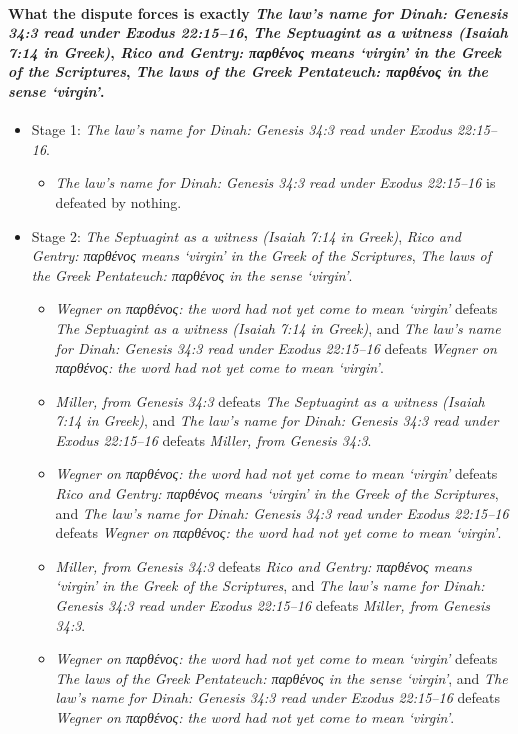 \documentclass[11pt]{article}
\begin{document}
\paragraph{What the dispute forces is exactly \emph{The law’s name for Dinah: Genesis 34:3 read under Exodus 22:15–16}, \emph{The Septuagint as a witness (Isaiah 7:14 in Greek)}, \emph{Rico and Gentry: παρθένος means ‘virgin’ in the Greek of the Scriptures}, \emph{The laws of the Greek Pentateuch: παρθένος in the sense ‘virgin’}.}
\begin{itemize}
\item Stage 1: \emph{The law’s name for Dinah: Genesis 34:3 read under Exodus 22:15–16}.
\begin{itemize}
\item \emph{The law’s name for Dinah: Genesis 34:3 read under Exodus 22:15–16} is defeated by nothing.
\end{itemize}
\item Stage 2: \emph{The Septuagint as a witness (Isaiah 7:14 in Greek)}, \emph{Rico and Gentry: παρθένος means ‘virgin’ in the Greek of the Scriptures}, \emph{The laws of the Greek Pentateuch: παρθένος in the sense ‘virgin’}.
\begin{itemize}
\item \emph{Wegner on παρθένος: the word had not yet come to mean ‘virgin’} defeats \emph{The Septuagint as a witness (Isaiah 7:14 in Greek)}, and \emph{The law’s name for Dinah: Genesis 34:3 read under Exodus 22:15–16} defeats \emph{Wegner on παρθένος: the word had not yet come to mean ‘virgin’}.
\item \emph{Miller, from Genesis 34:3} defeats \emph{The Septuagint as a witness (Isaiah 7:14 in Greek)}, and \emph{The law’s name for Dinah: Genesis 34:3 read under Exodus 22:15–16} defeats \emph{Miller, from Genesis 34:3}.
\item \emph{Wegner on παρθένος: the word had not yet come to mean ‘virgin’} defeats \emph{Rico and Gentry: παρθένος means ‘virgin’ in the Greek of the Scriptures}, and \emph{The law’s name for Dinah: Genesis 34:3 read under Exodus 22:15–16} defeats \emph{Wegner on παρθένος: the word had not yet come to mean ‘virgin’}.
\item \emph{Miller, from Genesis 34:3} defeats \emph{Rico and Gentry: παρθένος means ‘virgin’ in the Greek of the Scriptures}, and \emph{The law’s name for Dinah: Genesis 34:3 read under Exodus 22:15–16} defeats \emph{Miller, from Genesis 34:3}.
\item \emph{Wegner on παρθένος: the word had not yet come to mean ‘virgin’} defeats \emph{The laws of the Greek Pentateuch: παρθένος in the sense ‘virgin’}, and \emph{The law’s name for Dinah: Genesis 34:3 read under Exodus 22:15–16} defeats \emph{Wegner on παρθένος: the word had not yet come to mean ‘virgin’}.

\end{itemize}
\end{itemize}
\end{document}
